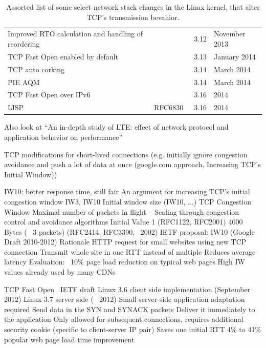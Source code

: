 \begin{table}[htb]
\begin{tabu}{X[1.4]XX[0.4]X[0.7]}
	Improved RTO calculation and handling of reordering & & 3.12 & November 2013 \\ %
	TCP Fast Open enabled by default & & 3.13 & January 2014 \\
	TCP auto corking & & 3.14 & March 2014 \\ %
	PIE AQM & & 3.14 & March 2014 \\ %
	TCP Fast Open over IPv6 & & 3.16 & 2014 \\
	LISP & RFC6830~\cite{rfc6830} & 3.16 & 2014 \\
	\bottomrule
	\end{tabu}
	\caption{Assorted list of some select network stack changes in the Linux kernel, that alter \gls{TCP}'s transmission bevahior.}
\label{c5:tab:linux-stack-changes}
\end{table}

Also look at ``An in-depth study of LTE: effect of network protocol and application behavior on performance'' \cite{Huang:2013:ISL:2486001.2486006}

TCP modifications for short-lived connections (e.g. initially ignore congestion avoidance and push a lot of data at once (google.com approach, Increasing TCP's Initial Window)) 

IW10: better response time, still fair \cite{rfc6928}
An argument for increasing \gls{TCP}'s initial congestion window \cite{dukkipati2010argument}
IW3, IW10  Initial window size (IW10, ...)
 TCP Congestion Window
	Maximal number of packets in flight
–	Scaling through congestion control and avoidance algorithms
 Initial Value
	1 (RFC1122, RFC2001)
	4000 Bytes (~ 3 packets) (RFC2414, RFC3390, ~2002)
	IETF proposal: IW10 (Google Draft 2010-2012)
 Rationale
	HTTP request for small websites using new TCP connection
	Transmit whole site in one RTT instead of multiple
	Reduces average latency
		Evaluation: ~10\% page load reduction on typical web pages
	High IW values already used by many CDNs



TCP Fast Open~\cite{cheng2014tcptfo}
 IETF draft
 Linux 3.6 client side implementation (September 2012)
 Linux 3.7 server side (~ 2012)
 Small server-side application adaptation required
 Send data in the SYN and SYNACK packets
	Deliver it immediately to the application
	Only allowed for subsequent connections, requires additional security cookie (specific to client-server IP pair)
 Saves one initial RTT
 4\% to 41\% popular web page load time improvement


